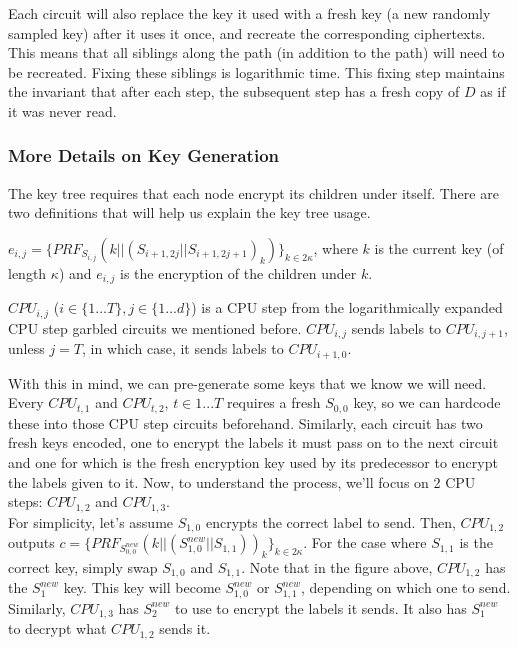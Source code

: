 
Each circuit will also replace the key it used with a fresh key (a new randomly sampled key) after it uses it once, and recreate the corresponding ciphertexts. This means that all siblings along the path (in addition to the path) will need to be recreated. Fixing these siblings is logarithmic time. This fixing step maintains the invariant that after each step, the subsequent step has a fresh copy of $D$ as if it was never read.

\subsubsection{More Details on Key Generation}
The key tree requires that each node encrypt its children under itself. There are two definitions that will help us explain the key tree usage.
\begin{definition}
$e_{i,j} = \{PRF_{S_{i,j}} (k || (S_{i+1,2j} || S_{i+1,2j+1})_{k})\}_{k\in2\kappa}$, where $k$ is the current key (of length $\kappa$) and $e_{i,j}$ is the encryption of the children under $k$.
\end{definition}

\begin{definition}
$CPU_{i,j}$ ($i \in \{1...T\}, j \in \{1...d\}$) is a CPU step from the logarithmically expanded CPU step garbled circuits we mentioned before. $CPU_{i,j}$ sends labels to $CPU_{i,j+1}$, unless $j=T$, in which case, it sends labels to $CPU_{i+1,0}$.
\end{definition}

With this in mind, we can pre-generate some keys that we know we will need. Every $CPU_{t,1}$ and $CPU_{t,2}$, $t \in {1...T}$ requires a fresh $S_{0,0}$ key, so we can hardcode these into those CPU step circuits beforehand. Similarly, each circuit has two fresh keys encoded, one to encrypt the labels it must pass on to the next circuit and one for which is the fresh encryption key used by its predecessor to encrypt the labels given to it. Now, to understand the process, we'll focus on 2 CPU steps: $CPU_{1,2}$ and $CPU_{1,3}$.\\
%

For simplicity, let's assume $S_{1,0}$ encrypts the correct label to send. Then, $CPU_{1,2}$ outputs $c = \{PRF_{S_{0,0}^{new}} (k || (S_{1,0}^{new} || S_{1,1}))_{k}\}_{k \in 2\kappa}$. For the case where $S_{1,1}$ is the correct key, simply swap $S_{1,0}$ and $S_{1,1}$. Note that in the figure above, $CPU_{1,2}$ has the $S_{1}^{new}$ key. This key will become $S_{1,0}^{new}$ or $S_{1,1}^{new}$, depending on which one to send. Similarly, $CPU_{1,3}$ has $S_{2}^{new}$ to use to encrypt the labels it sends. It also has $S_{1}^{new}$ to decrypt what $CPU_{1,2}$ sends it.


